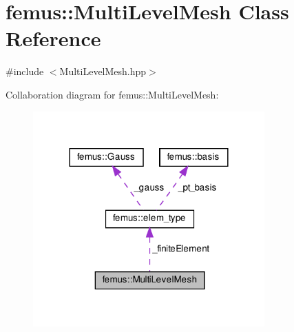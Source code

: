 \hypertarget{classfemus_1_1_multi_level_mesh}{}\section{femus\+:\+:Multi\+Level\+Mesh Class Reference}
\label{classfemus_1_1_multi_level_mesh}


{\ttfamily \#include $<$Multi\+Level\+Mesh.\+hpp$>$}



Collaboration diagram for femus\+:\+:Multi\+Level\+Mesh\+:
\nopagebreak
\begin{figure}[H]
\begin{center}
\leavevmode
\includegraphics[width=252pt]{classfemus_1_1_multi_level_mesh__coll__graph}
\end{center}
\end{figure}
